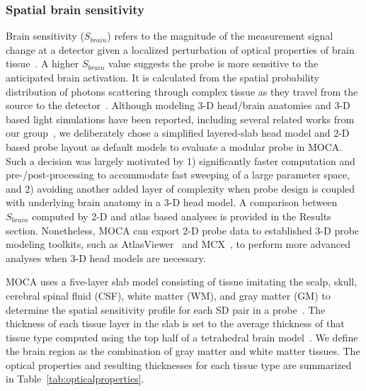 \subsubsection{Spatial brain sensitivity}
\label{sssec:averagebrainsensitivity}
Brain sensitivity ($S_{brain}$) refers to the magnitude of the measurement signal change at a detector given a localized perturbation of optical properties of brain tissue~\cite{Strangman2013}. A higher $S_{brain}$ value suggests the probe is more sensitive to the anticipated brain activation. It is calculated from the spatial probability distribution of photons scattering through complex tissue as they travel from the source to the detector~\cite{Brigadoi2015}. Although modeling 3-D head/brain anatomies and 3-D based light simulations have been reported, including several related works from our group~\cite{Fang2009,Fang2009a,Fang2010,Brain2Mesh2020}, we deliberately chose a simplified layered-slab head model and 2-D based probe layout as default models to evaluate a modular probe in MOCA. Such a decision was largely motivated by 1) significantly faster computation and pre-/post-processing to accommodate fast sweeping of a large parameter space, and 2) avoiding another added layer of complexity when probe design is coupled with underlying brain anatomy in a 3-D head model. A comparison between $S_{brain}$ computed by 2-D and atlas based analyses is provided in the Results section. Nonetheless, MOCA can export 2-D probe data to established 3-D probe modeling toolkits, such as AtlasViewer~\cite{Aasted2015} and MCX~\cite{Fang2009}, to perform more advanced analyses when 3-D head models are necessary.

MOCA uses a five-layer slab model consisting of tissue imitating the scalp, skull, cerebral spinal fluid (CSF), white matter (WM), and gray matter (GM) to determine the spatial sensitivity profile for each SD pair in a probe~\cite{Okada2003}. The thickness of each tissue layer in the slab is set to the average thickness of that tissue type computed using the top half of a tetrahedral brain model~\cite{Sanchez2012}. We define the brain region as the combination of gray matter and white matter tissues. The optical properties and resulting thicknesses for each tissue type are summarized in Table~\ref{tab:opticalproperties}.

